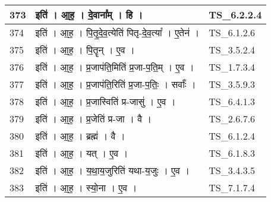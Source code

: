 \documentclass[17pt]{extarticle}
\begin{document}
\begin{longtable}{||p{0.4in}||p{4.9in}||p{0.9in}||}
    \hline
        
    373 & इति॑   ।   आ॒ह॒   ।   दे॒वाना᳚म्   ।   हि   ।    & TS\_6.2.2.4       \\
    
    \hline
        
    374 & इति॑   ।   आ॒ह॒   ।   पि॒तृ॒दे॒व॒त्येति॑ पितृ{-}दे॒व॒त्या᳚   ।   ए॒तेन॑   ।    & TS\_6.1.2.6       \\
    
    \hline
        
    375 & इति॑   ।   आ॒ह॒   ।   पि॒तॄन्   ।   ए॒व   ।    & TS\_3.5.2.4       \\
    
    \hline
        
    376 & इति॑   ।   आ॒ह॒   ।   प्र॒जाप॑ति॒मिति॑ प्र॒जा{-}प॒ति॒म्   ।   ए॒व   ।    & TS\_1.7.3.4       \\
    
    \hline
        
    377 & इति॑   ।   आ॒ह॒   ।   प्र॒जाप॑ति॒रिति॑ प्र॒जा{-}प॒तिः॒   ।   सर्वाः᳚   ।    & TS\_3.5.9.3       \\
    
    \hline
        
    378 & इति॑   ।   आ॒ह॒   ।   प्र॒जास्विति॑ प्र{-}जासु॑   ।   ए॒व   ।    & TS\_6.4.1.3       \\
    
    \hline
        
    379 & इति॑   ।   आ॒ह॒   ।   प्र॒जेति॑ प्र{-}जा   ।   वै   ।    & TS\_2.6.7.6       \\
    
    \hline
        
    380 & इति॑   ।   आ॒ह॒   ।   ब्रह्म॑   ।   वै   ।    & TS\_6.1.2.4       \\
    
    \hline
        
    381 & इति॑   ।   आ॒ह॒   ।   यत्   ।   ए॒व   ।    & TS\_6.1.8.3       \\
    
    \hline
        
    382 & इति॑   ।   आ॒ह॒   ।   य॒था॒य॒जुरिति॑ यथा{-}य॒जुः   ।   ए॒व   ।    & TS\_3.4.3.5       \\
    
    \hline
        
    383 & इति॑   ।   आ॒ह॒   ।   स्यो॒ना   ।   ए॒व   ।    & TS\_7.1.7.4       \\
    

\end{longtable}
\end{document}
